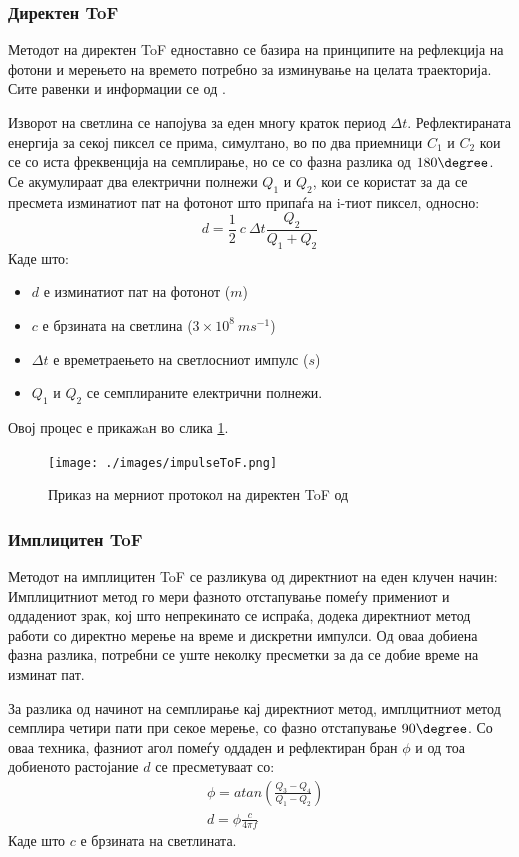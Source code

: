 \documentclass[11pt]{article}
\begin{document}
	  \subsubsection{Директен ToF}
		  Методот на директен ToF едноставно се базира на принципите на рефлекција на фотони и мерењето на времето потребно за изминување на целата траекторија. Сите равенки и информации се од \cite{tofwhitepaper}.

		    Изворот на светлина се напојува за еден многу краток период $ \Delta t $. Рефлектираната енергија за секој пиксел се прима, симултано, во по два приемници $C_1$ и $C_2$ кои се со иста фреквенција на семплирање, но се со фазна разлика од $180 \degree$. Се акумулираат два електрични полнежи $Q_1$ и  $Q_2$, кои се користат за да се пресмета изминатиот пат на фотонот што припаѓа на i-тиот пиксел, односно:
		    \begin{equation}
            d = \frac{1}{2} \ c\  \Delta t \frac{Q_2}{Q_1 + Q_2}
        \end{equation}
    Каде што:
		\begin{itemize}
			\item $d$ е изминатиот пат на фотонот ($m$)
			\item $c$ е брзината на светлина ($ 3 \times 10^8\ ms^{-1} $)
			\item $\Delta t$ е времетраењето на светлосниот импулс ($s$)
			\item $Q_1$ и $Q_2$ се семплираните електрични полнежи.
			\end{itemize}
    Овој процес е прикажaн во слика \ref{fig:impulseToF}.
		\begin{figure}[H]
			\texttt{[image: ./images/impulseToF.png]}
			\centering
			\caption{Приказ на мерниот протокол на директен ToF од \cite{tofwhitepaper}}
			\label{fig:impulseToF}
			\end{figure}

	  \subsubsection{Имплицитен ToF}
		  Методот на имплицитен ToF се разликува од директниот на еден клучен начин: Имплицитниот метод го мери фазното отстапување помеѓу примениот и оддадениот зрак, кој што непрекинато се испраќа, додека директниот метод работи со директно мерење на време и дискретни импулси. Од оваа добиена фазна разлика, потребни се уште неколку пресметки за да се добие време на изминат пат.

		  За разлика од начинот на семплирање кај директниот метод, имплцитниот метод семплира четири пати при секое мерење, со фазно отстапување $90\degree$. Со оваа техника, фазниот агол помеѓу оддаден и рефлектиран бран $\phi$ и од тоа добиеното растојание $d$ се пресметуваат со:
      \begin{align}
        & \phi = atan(\frac{Q_3 - Q_4}{Q_1 - Q_2}) \nonumber \\
        & d = \phi \frac{c}{4\pi f}
      \end{align}
      Каде што $c$ е брзината на светлината.
\end{document}
